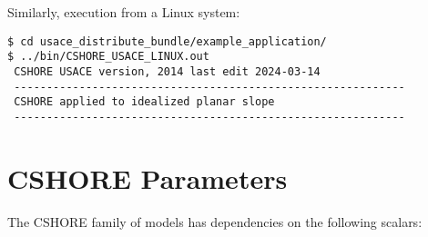 \documentclass[11pt,oneside]{book}
\begin{document}
Similarly, execution from a Linux system:

\begin{verbatim}
$ cd usace_distribute_bundle/example_application/
$ ../bin/CSHORE_USACE_LINUX.out 
 CSHORE USACE version, 2014 last edit 2024-03-14                       
 ------------------------------------------------------------          
 CSHORE applied to idealized planar slope                              
 ------------------------------------------------------------          
\end{verbatim}

\section*{CSHORE Parameters}

\noindent The CSHORE family of models has dependencies on the following scalars:
\end{document}
